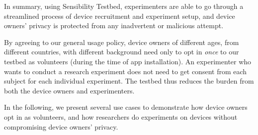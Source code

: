 \smallskip
In summary, 
%
%
using Sensibility Testbed, experimenters are able to go 
through a streamlined process of device recruitment and 
experiment setup, and device owners' privacy is protected
from any inadvertent or malicious attempt.

By agreeing to our general usage policy, device 
owners of different ages, from different countries, with different
background need only to opt in \textit{once} to our testbed as 
volunteers (during the time of app installation). An experimenter 
who wants to conduct a research experiment 
does not need to get consent from each subject for each individual
experiment. The testbed thus reduces the burden from both the 
device owners and experimenters. 

In the following, we present several use cases to
demonstrate how device owners opt in as volunteers, and how
researchers do experiments on devices without compromising device
owners' privacy.

